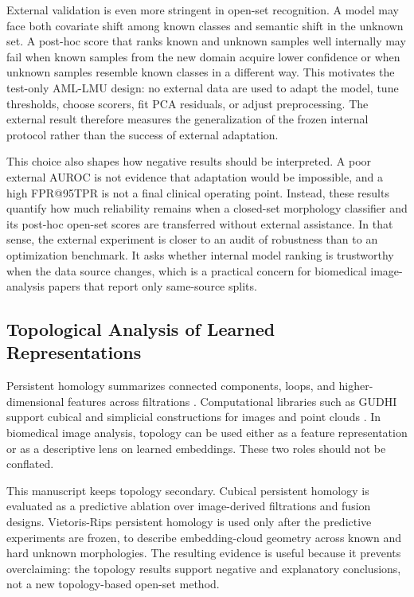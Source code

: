 External validation is even more stringent in open-set recognition. A model may face both covariate shift among known classes and semantic shift in the unknown set. A post-hoc score that ranks known and unknown samples well internally may fail when known samples from the new domain acquire lower confidence or when unknown samples resemble known classes in a different way. This motivates the test-only AML-LMU design: no external data are used to adapt the model, tune thresholds, choose scorers, fit PCA residuals, or adjust preprocessing. The external result therefore measures the generalization of the frozen internal protocol rather than the success of external adaptation.

This choice also shapes how negative results should be interpreted. A poor external AUROC is not evidence that adaptation would be impossible, and a high FPR@95TPR is not a final clinical operating point. Instead, these results quantify how much reliability remains when a closed-set morphology classifier and its post-hoc open-set scores are transferred without external assistance. In that sense, the external experiment is closer to an audit of robustness than to an optimization benchmark. It asks whether internal model ranking is trustworthy when the data source changes, which is a practical concern for biomedical image-analysis papers that report only same-source splits.

\subsection{Topological Analysis of Learned Representations}

Persistent homology summarizes connected components, loops, and higher-dimensional features across filtrations \cite{edelsbrunner2002_persistence,carlsson2009_topology}. Computational libraries such as GUDHI support cubical and simplicial constructions for images and point clouds \cite{maria2014_gudhi}. In biomedical image analysis, topology can be used either as a feature representation or as a descriptive lens on learned embeddings. These two roles should not be conflated.

This manuscript keeps topology secondary. Cubical persistent homology is evaluated as a predictive ablation over image-derived filtrations and fusion designs. Vietoris-Rips persistent homology is used only after the predictive experiments are frozen, to describe embedding-cloud geometry across known and hard unknown morphologies. The resulting evidence is useful because it prevents overclaiming: the topology results support negative and explanatory conclusions, not a new topology-based open-set method.
